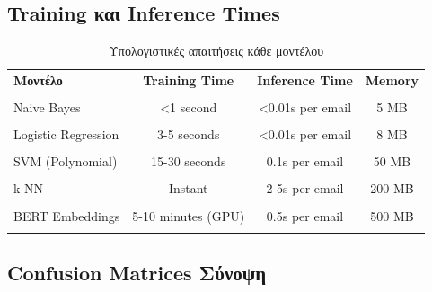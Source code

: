 \documentclass[12pt,a4paper,twoside]{book}
\begin{document}
\subsection{Training και Inference Times}

\begin{table}[H]
    \centering
    \begin{tabular}{lccc}
        \hline
        \textbf{Μοντέλο}    & \textbf{Training Time} & \textbf{Inference Time} & \textbf{Memory} \\\\
        \hline
        Naive Bayes         & <1 second              & <0.01s per email        & 5 MB            \\\\
        Logistic Regression & 3-5 seconds            & <0.01s per email        & 8 MB            \\\\
        SVM (Polynomial)    & 15-30 seconds          & 0.1s per email          & 50 MB           \\\\
        k-NN                & Instant                & 2-5s per email          & 200 MB          \\\\
        BERT Embeddings     & 5-10 minutes (GPU)     & 0.5s per email          & 500 MB          \\\\
        \hline
    \end{tabular}
    \caption{Υπολογιστικές απαιτήσεις κάθε μοντέλου}
\end{table}

\subsection{Confusion Matrices Σύνοψη}
\end{document}

